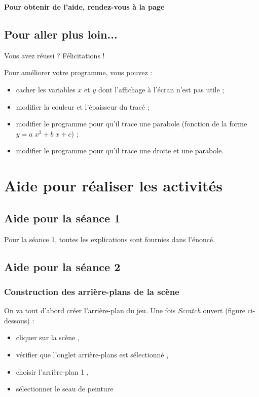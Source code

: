 \textbf{Pour obtenir de l'aide, rendez-vous à la page \pageref{aide_seanceScratch3}}

\subsection{Pour aller plus loin...}

Vous avez réussi ? Félicitations !

\vspace{6pt}

Pour améliorer votre programme, vous pouvez :

\begin{itemize}
\item cacher les variables $x$ et $y$ dont l'affichage à l'écran n'est pas utile ;
\item modifier la couleur et l'épaisseur du tracé ; 
\item modifier le programme pour qu'il trace une parabole (fonction de la forme $y=a \; x^2 + b \; x + c$) ;
\item modifier le programme pour qu'il trace une droite et une parabole. 
\end{itemize}


\newpage

\section{Aide pour réaliser les activités}

\subsection{Aide pour la séance 1}

Pour la séance 1, toutes les explications sont fournies dans l'énoncé.

\subsection{Aide pour la séance 2}\label{aide_seanceScratch2}

\subsubsection{Construction des arrière-plans de la scène}

On va tout d'abord créer l'arrière-plan du jeu. Une fois \emph{Scratch} ouvert (figure ci-dessous) :
\begin{itemize}
\item cliquer sur la scène , 
\item vérifier que l'onglet arrière-plans est sélectionné , 
\item choisir l'arrière-plan 1 , 
\item sélectionner le seau de peinture 
\end{itemize}


